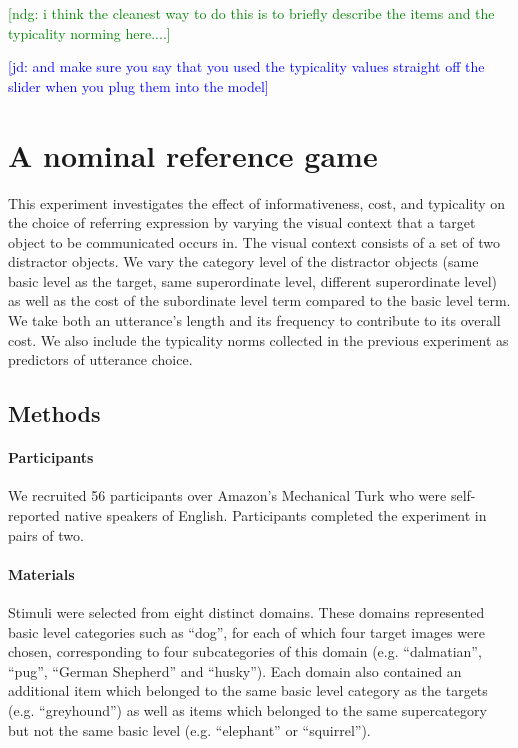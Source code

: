 \documentclass[10pt,letterpaper]{article}
\newcommand{\ndg}[1]{\textcolor{Green}{[ndg: #1]}}
\newcommand{\jd}[1]{\textcolor{Blue}{[jd: #1]}}
\begin{document}
\ndg{i think the cleanest way to do this is to briefly describe the items and the typicality norming here....}

\jd{and make sure you say that you used the typicality values straight off the slider when you plug them into the model}

\section{A nominal reference game}

This experiment investigates the effect of informativeness, cost, and typicality on the choice of referring expression by varying the visual context that a target object to be communicated occurs in. The visual context consists of a set of two distractor objects. We vary the category level of the distractor objects (same basic level as the target, same superordinate level, different superordinate level) as well as the cost of the subordinate level term compared to the basic level term. We take both an utterance's  length and its frequency to contribute to its overall cost. We also include the typicality norms collected in the previous experiment as predictors of utterance choice.


\subsection{\bf Methods}


\paragraph{\bf Participants}
We recruited 56 participants over Amazon's Mechanical Turk who were self-reported native speakers of English. Participants completed the experiment in pairs of two.

\paragraph{\bf Materials}
Stimuli were selected from eight distinct domains. These domains represented basic level categories such as ``dog'', for each of which four target images were chosen, corresponding to four subcategories of this domain (e.g. ``dalmatian'', ``pug'', ``German Shepherd'' and ``husky''). Each domain also contained an additional item which belonged to the same basic level category as the targets (e.g. ``greyhound'') as well as items which belonged to the same supercategory but not the same basic level (e.g. ``elephant'' or ``squirrel''). 
\end{document}
